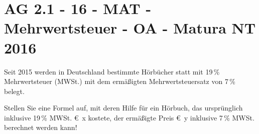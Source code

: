 \section{AG 2.1 - 16 - MAT - Mehrwertsteuer - OA - Matura NT 2016}

\begin{beispiel}[AG 2.1]{1} %
Seit 2015 werden in Deutschland bestimmte Hörbücher statt mit 19\,\% Mehrwertsteuer (MWSt.) mit dem ermäßigten Mehrwertsteuersatz von 7\,\% belegt.

Stellen Sie eine Formel auf, mit deren Hilfe für ein Hörbuch, das ursprünglich inklusive 19\,\% MWSt. \euro\, x kostete, der ermäßigte Preis \euro\, y inklusive 7\,\% MWSt. berechnet werden kann!

\end{beispiel}
